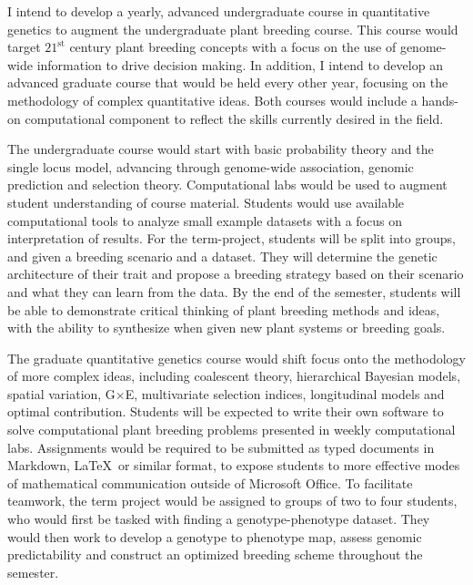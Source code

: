 \documentclass[11pt]{article}
\begin{document}
I intend to develop a yearly, advanced undergraduate course in quantitative genetics to augment the undergraduate plant breeding course. This course would target $21^\text{st}$ century plant breeding concepts with a focus on the use of genome-wide information to drive decision making. In addition, I intend to develop an advanced graduate course that would be held every other year, focusing on the methodology of complex quantitative ideas. Both courses would include a hands-on computational component to reflect the skills currently desired in the field.

The undergraduate course would start with basic probability theory and the single locus model, advancing through genome-wide association, genomic prediction and selection theory. Computational labs would be used to augment student understanding of course material. Students would use available computational tools to analyze small example datasets with a focus on interpretation of results. For the term-project, students will be split into groups, and given a breeding scenario and a dataset. They will determine the genetic architecture of their trait and propose a breeding strategy based on their scenario and what they can learn from the data. By the end of the semester, students will be able to demonstrate critical thinking of plant breeding methods and ideas, with the ability to synthesize when given new plant systems or breeding goals. 

The graduate quantitative genetics course would shift focus onto the methodology of more complex ideas, including coalescent theory, hierarchical Bayesian models, spatial variation, G$\times$E, multivariate selection indices, longitudinal models and optimal contribution. Students will be expected to write their own software to solve computational plant breeding problems presented in weekly computational labs. Assignments would be required to be submitted as typed documents in Markdown, \LaTeX\ or similar format, to expose students to more effective modes of mathematical communication outside of Microsoft Office. To facilitate teamwork, the term project would be assigned to groups of two to four students, who would first be tasked with finding a genotype-phenotype dataset. They would then work to develop a genotype to phenotype map, assess genomic predictability and construct an optimized breeding scheme throughout the semester. 


\end{document}
